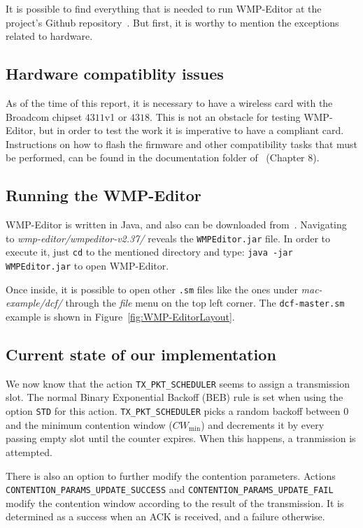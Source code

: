 It is possible to find everything that is needed to run WMP-Editor at the project's Github repository~\cite{WMP-code}. But first, it is worthy to mention the exceptions related to hardware.

\subsection{Hardware compatiblity issues}

As of the time of this report, it is necessary to have a wireless card with the Broadcom chipset $4311$v1 or $4318$. This is not an obstacle for testing WMP-Editor, but in order to test the work it is imperative to have a compliant card. Instructions on how to flash the firmware and other compatibility tasks that must be performed, can be found in the documentation folder of~\cite{WMP-code} (Chapter $8$).

\subsection{Running the WMP-Editor}

WMP-Editor is written in Java, and also can be downloaded from~\cite{WMP-code}. Navigating to \emph{wmp-editor/wmpeditor-v2.37/} reveals the \texttt{WMPEditor.jar} file. In order to execute it, just \texttt{cd} to the mentioned directory and type: \texttt{java -jar WMPEditor.jar} to open WMP-Editor.

Once inside, it is possible to open other \texttt{.sm} files like the ones under \emph{mac-example/dcf/} through the \emph{file} menu on the top left corner. The \texttt{dcf-master.sm} example is shown in Figure~\ref{fig:WMP-EditorLayout}.

\subsection{Current state of our implementation}

We now know that the action \texttt{TX\_PKT\_SCHEDULER} seems to assign a transmission slot. The normal Binary Exponential Backoff (BEB) rule is set when using the option \texttt{STD} for this action. \texttt{TX\_PKT\_SCHEDULER} picks a random backoff between $0$ and the minimum contention window ($CW_{\min}$) and decrements it by every passing empty slot until the counter expires. When this happens, a tranmission is attempted.

There is also an option to further modify the contention parameters. Actions \texttt{CONTENTION\_PARAMS\_UPDATE\_SUCCESS} and \texttt{CONTENTION\_PARAMS\_UPDATE\_FAIL} modify the contention window according to the result of the transmission. It is determined as a success when an ACK is received, and a failure otherwise.

